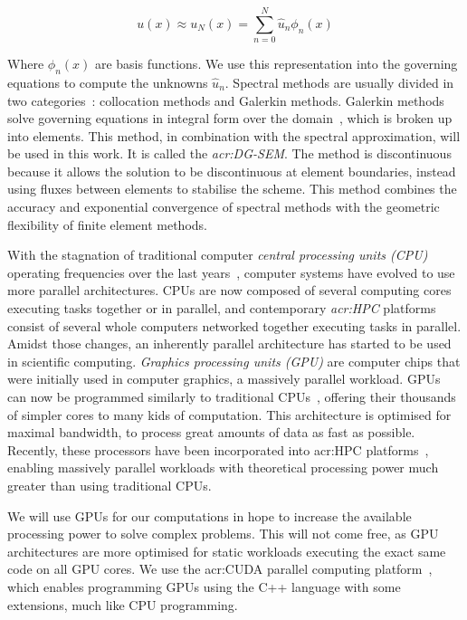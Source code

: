 \begin{equation}
	u(x) \approx u_N(x) = \sum_{n = 0}^{N} \widehat{u}_n \phi _n(x)
\end{equation}

Where $\phi _n(x)$ are basis functions. We use this representation into the governing equations to
compute the unknowns $\widehat{u}_n$. Spectral methods are usually divided in two
categories~\cite{Karniadakis2005}: collocation methods and Galerkin methods. Galerkin methods solve
governing equations in integral form over the domain~\cite{Reed1973}, which is broken up into
elements. This method, in combination with the spectral approximation, will be used in this work. It
is called the \textit{\acrfull{acr:DG-SEM}}. The method is discontinuous because it allows the
solution to be discontinuous at element boundaries, instead using fluxes between elements to
stabilise the scheme. This method combines the accuracy and exponential convergence of spectral
methods with the geometric flexibility of finite element methods. 

With the stagnation of traditional computer \textit{central processing units (CPU)} operating
frequencies over the last years~\cite{Parkhurst2006}, computer systems have evolved to use more
parallel architectures. CPUs are now composed of several computing cores~\cite{Nayfeh1997} executing
tasks together or in parallel, and contemporary \textit{\acrfull{acr:HPC}} platforms consist of
several whole computers networked together executing tasks in parallel. Amidst those changes, an
inherently parallel architecture has started to be used in scientific computing. \textit{Graphics
processing units (GPU)} are computer chips that were initially used in computer graphics, a
massively parallel workload. GPUs can now be programmed similarly to traditional
CPUs~\cite{Owens2008}, offering their thousands of simpler cores to many kids of computation. This
architecture is optimised for maximal bandwidth, to process great amounts of data as fast as
possible. Recently, these processors have been incorporated into \acrshort{acr:HPC}
platforms~\cite{Fan2004}, enabling massively parallel workloads with theoretical processing power
much greater than using traditional CPUs.

We will use GPUs for our computations in hope to increase the available processing power to solve
complex problems. This will not come free, as GPU architectures are more optimised for static
workloads executing the exact same code on all GPU cores. We use the \acrshort{acr:CUDA} parallel
computing platform~\cite{Garland2008}, which enables programming GPUs using the C++ language with
some extensions, much like CPU programming.


